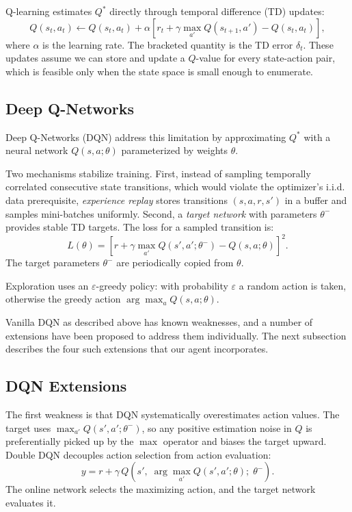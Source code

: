 \documentclass[12pt,a4paper,titlepage]{article}
\begin{document}
Q-learning estimates $Q^*$ directly through temporal difference (TD) updates:
\begin{equation}
Q(s_t, a_t) \leftarrow Q(s_t, a_t) + \alpha\!\left[r_t + \gamma \max_{a'} Q(s_{t+1}, a') - Q(s_t, a_t)\right],
\end{equation}
where $\alpha$ is the learning rate. The bracketed quantity is the TD error $\delta_t$. These updates assume we can store and update a $Q$-value for every state-action pair, which is feasible only when the state space is small enough to enumerate.

\subsection{Deep Q-Networks}

Deep Q-Networks (DQN) \citep{Mnih2013, Mnih2015} address this limitation by approximating $Q^*$ with a neural network $Q(s, a; \theta)$ parameterized by weights $\theta$.

Two mechanisms stabilize training. First, instead of sampling temporally correlated consecutive state transitions, which would violate the optimizer's i.i.d. data prerequisite, \emph{experience replay} stores transitions $(s, a, r, s')$ in a buffer and samples mini-batches uniformly. Second, a \emph{target network} with parameters $\theta^-$ provides stable TD targets. The loss for a sampled transition is:
\begin{equation}
L(\theta) = \left[r + \gamma \max_{a'} Q(s', a'; \theta^-) - Q(s, a; \theta)\right]^2.
\end{equation}
The target parameters $\theta^-$ are periodically copied from $\theta$.

Exploration uses an $\varepsilon$-greedy policy: with probability $\varepsilon$ a random action is taken, otherwise the greedy action $\arg\max_a Q(s, a; \theta)$.

Vanilla DQN as described above has known weaknesses, and a number of extensions have been proposed to address them individually. The next subsection describes the four such extensions that our agent incorporates.

\subsection{DQN Extensions}
\label{sec:dqn_extensions}

The first weakness is that DQN systematically overestimates action values. The target uses $\max_{a'} Q(s', a'; \theta^-)$, so any positive estimation noise in $Q$ is preferentially picked up by the $\max$ operator and biases the target upward. Double DQN \citep{vanHasselt2016} decouples action selection from action evaluation:
\begin{equation}
y = r + \gamma\, Q\!\left(s',\; \arg\max_{a'} Q(s', a'; \theta);\; \theta^-\right).
\end{equation}
The online network selects the maximizing action, and the target network evaluates it.
\end{document}
